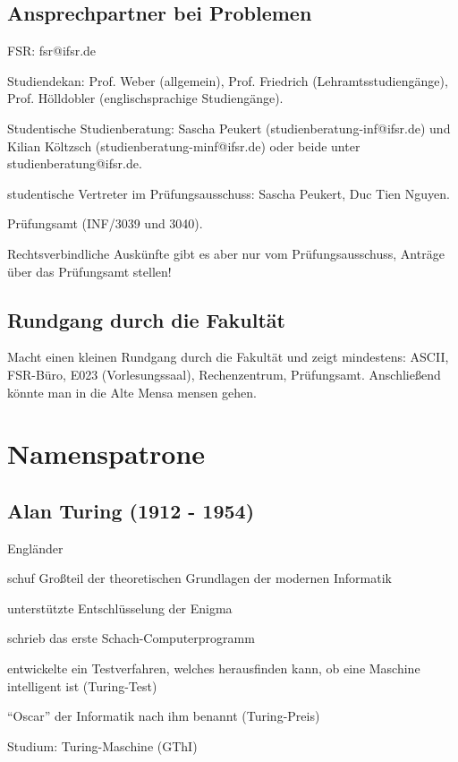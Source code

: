 \documentclass[a4paper,12pt]{report}
\begin{document}
\section{Ansprechpartner bei Problemen}
\begin{itemize*}
	\item FSR: fsr@ifsr.de
	\item Studiendekan: Prof. Weber (allgemein), Prof. Friedrich (Lehramtsstudiengänge), Prof. Hölldobler (englischsprachige Studiengänge).
	\item Studentische Studienberatung: Sascha Peukert (studienberatung-inf@ifsr.de) und Kilian Költzsch (studienberatung-minf@ifsr.de) oder beide unter studienberatung@ifsr.de.
	\item studentische Vertreter im Prüfungsausschuss: Sascha Peukert, Duc Tien Nguyen.
	\item Prüfungsamt (INF/3039 und 3040).
	\item Rechtsverbindliche Auskünfte gibt es aber nur vom Prüfungsausschuss, Anträge über das Prüfungsamt stellen!
\end{itemize*}

\section{Rundgang durch die Fakultät}
Macht einen kleinen Rundgang durch die Fakultät und zeigt mindestens: ASCII, FSR-Büro, E023 (Vorlesungssaal), Rechenzentrum, Prüfungsamt.
Anschließend könnte man in die Alte Mensa mensen gehen.

\chapter{Namenspatrone}
\section{Alan Turing (1912 - 1954)}
\begin{itemize*}
	\item Engländer
	\item schuf Großteil der theoretischen Grundlagen der modernen Informatik
	\item unterstützte Entschlüsselung der Enigma
	\item schrieb das erste Schach-Computerprogramm
	\item entwickelte ein Testverfahren, welches herausfinden kann, ob eine Maschine intelligent ist (Turing-Test)
	\item ``Oscar'' der Informatik nach ihm benannt (Turing-Preis)
	\item Studium: Turing-Maschine (GThI)
\end{itemize*}
\end{document}
